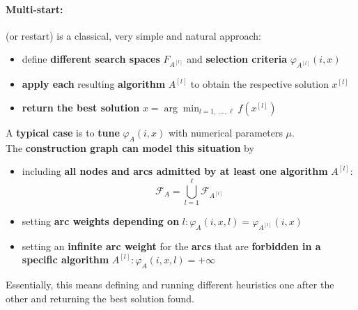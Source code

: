 \documentclass[11pt]{article}
\begin{document}
	\paragraph{Multi-start:} (or restart) is a classical, very simple and natural approach:
	\begin{itemize}
		\item define \textbf{different search spaces} $F_{A^{[l]}}$ and \textbf{selection criteria} $\varphi_{A^{[l]}} (i, x)$
		
		\item \textbf{apply each} resulting \textbf{algorithm} $A^{[l]}$ to obtain the respective solution $x^{[l]}$
		
		\item \textbf{return the best solution} $x = \arg \min_{l = 1, \, ... \, , \ell} f(x^{[l]})$
	\end{itemize}
	
	A \textbf{typical case} is to \textbf{tune} $\varphi_A (i, x)$ with numerical parameters $\mu$.\\
	
	The \textbf{construction graph can model this situation} by
	\begin{itemize}
		\item including \textbf{all nodes and arcs admitted by at least one algorithm} $A^{[l]}$:
		$$ \mathcal{F}_A = \bigcup_{l=1}^\ell \mathcal{F}_{A^{[l]}} $$
		
		\item setting \textbf{arc weights depending on} $l: \varphi_A (i, x, l) = \varphi_{A^{[l]}} (i, x)$
		
		\item setting an \textbf{infinite arc weight} for the \textbf{arcs} that are \textbf{forbidden in a specific algorithm} $A^{[l]}:\varphi_A (i, x, l) = + \infty$
	\end{itemize}
	
	Essentially, this means defining and running different heuristics one after the other and returning the best solution found.\\
	
\end{document}
